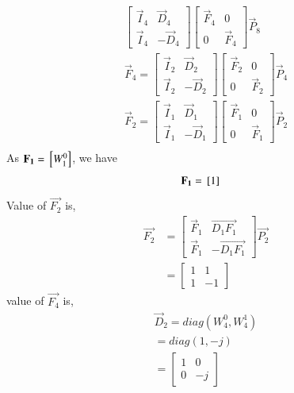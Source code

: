 \documentclass[journal,12pt,twocolumn]{IEEEtran}
\renewcommand\thesection{\arabic{section}}
\begin{document}
\begin{enumerate}[label=\arabic*.,ref=\thesection.\theenumi]
\begin{align}
\begin{bmatrix}
			\vec{I}_{4} & \vec{D}_{4} \\
			\vec{I}_{4} & -\vec{D}_{4}
		\end{bmatrix}
		\begin{bmatrix}
			\vec{F}_{4} & 0 \\
			0 & \vec{F}_{4}
		\end{bmatrix}
		\vec{P}_{8}\\
		\vec{F}_{4}=
		\begin{bmatrix}
			\vec{I}_{2} & \vec{D}_{2} \\
			\vec{I}_{2} & -\vec{D}_{2}
		\end{bmatrix}
		\begin{bmatrix}
			\vec{F}_{2} & 0 \\
			0 & \vec{F}_{2}
		\end{bmatrix}
		\vec{P}_{4}\\
		\vec{F}_{2}=
		\begin{bmatrix}
			\vec{I}_{1} & \vec{D}_{1} \\
			\vec{I}_{1} & -\vec{D}_{1}
		\end{bmatrix}
		\begin{bmatrix}
			\vec{F}_{1} & 0 \\
			0 & \vec{F}_{1}
		\end{bmatrix}
		\vec{P}_{2}\\
		\end{align}
	As $\mathbf{F_1}={}\left[W_1^{0}\right]$, we have
	\begin{align}
		\mathbf{F_1}&={}\left[1\right]
	\end{align}
	Value of $\vec{F_2}$ is,
	\begin{align}
		\vec{F_2}&=\begin{bmatrix}
			\vec{F}_{1} & \vec{D_1F_1} \\
			\vec{F}_{1} & -\vec{D_1F_1}
		\end{bmatrix}\vec{P_2}\\
		&=\begin{bmatrix}1&1\\1&-1\end{bmatrix}
	\end{align}
	value of $\vec{F_4}$ is,
	\begin{align}
		\vec{D}_{2}=diag(W_4^0,W_4^1)\\
		=diag(1,-j)\\					
		=\begin{bmatrix}
			1&0\\0&-j
		\end{bmatrix}\\

\end{align}
\end{enumerate}
\end{document}
